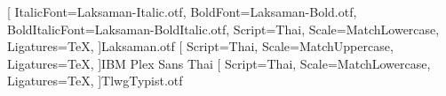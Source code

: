 
\usepackage{fontspec}
\usepackage[english]{babel}
[%
	ItalicFont={Laksaman-Italic.otf},%
	BoldFont={Laksaman-Bold.otf},%
	BoldItalicFont={Laksaman-BoldItalic.otf},%
	Script=Thai,%
	Scale=MatchLowercase,%
	Ligatures=TeX,
]{Laksaman.otf} %
[%
	Script=Thai,%
	Scale=MatchUppercase,%
	Ligatures=TeX,
]{IBM Plex Sans Thai} %
[%
	Script=Thai,%
	Scale=MatchLowercase,%
	Ligatures=TeX,
]{TlwgTypist.otf} %
\newfontfamily{}
\newfontfamily{}
\newcommand{\thaisf}[1]{{\thaifontsf #1}}
\newcommand{\thaitt}[1]{{\thaifonttt #1}}


\usepackage{luatexja} %
\usepackage[match]{luatexja-fontspec}

